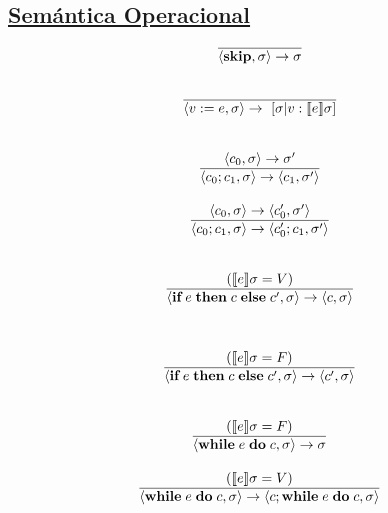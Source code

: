   \subsection*{\underline{Semántica Operacional}}
    \begin{multicols}{2}
      \[\begin{array}{cll}
        \noindent
        \overline{\lang{\skipp, \sigma} \rightarrow \sigma} \\ \\ \\
        
        \overline{\lang{v := e, \sigma} \rightarrow [\sigma | v : \semsAGU{e}]} \\ \\ \\
        
        \lang{c_0, \sigma} \rightarrow \sigma' \\
        \overline{\lang{c_0;c_1, \sigma} \rightarrow \lang{c_1, \sigma'}} \\ \\
        \lang{c_0, \sigma} \rightarrow \lang{c'_0, \sigma'} \\
        \overline{\lang{c_0;c_1, \sigma} \rightarrow \lang{c'_0; c_1, \sigma'}} \\ \\ \\
        
        (\semsAGU{e} = V) \\
        \overline{\lang{\ifthenelse{e}{c}{c'}, \sigma} \rightarrow \lang{c, \sigma}} \\ \\
      \end{array}\]
      \[\begin{array}{cll}
        \noindent
        \\
        (\semsAGU{e} = F) \\
        \overline{\lang{\ifthenelse{e}{c}{c'}, \sigma} \rightarrow \lang{c', \sigma}} \\ \\ \\

        (\semsAGU{e} = F) \\
        \overline{\lang{\while{e}{c}, \sigma} \rightarrow \sigma} \\ \\
        (\semsAGU{e} = V) \\
        \overline{\lang{\while{e}{c}, \sigma} \rightarrow \lang{c; \while{e}{c}, \sigma}} \\ \\ \\


\end{array}\]
\end{multicols}
